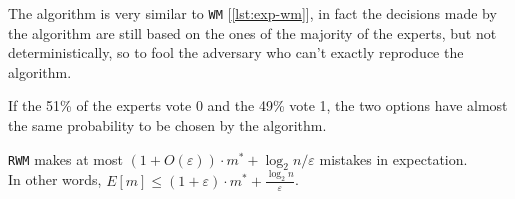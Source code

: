 \begin{obs}
    The algorithm is very similar to \texttt{WM} [\ref{lst:exp-wm}], in fact the decisions made by the algorithm are still based on the ones of the majority of the experts, but not deterministically, so to fool the adversary who can't exactly reproduce the algorithm.
\end{obs}

\begin{ex}
    If the 51\% of the experts vote 0 and the 49\% vote 1, the two options have almost the same probability to be chosen by the algorithm.
\end{ex}

\begin{lem}\label{lem:exp-rwm-erros}
    \texttt{RWM} makes at most $(1 + O(\varepsilon)) \cdot m^* + \log_2 n / \varepsilon$ mistakes in expectation.\\
    In other words, $E[m] \leq (1 + \varepsilon) \cdot m^* + \frac{\log_2 n}{\varepsilon}$.
\end{lem}

